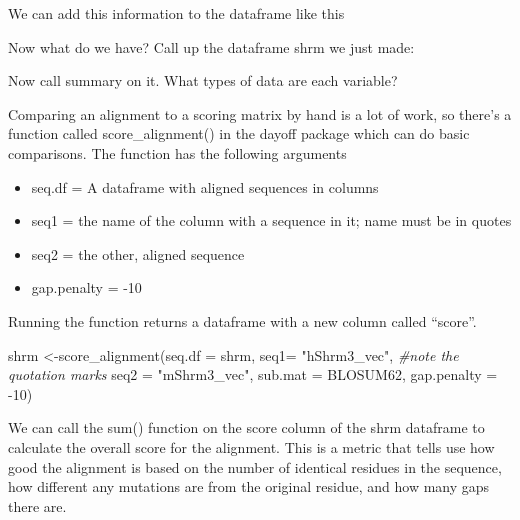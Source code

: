 \documentclass[
]{book}
\newenvironment{Shaded}{\begin{snugshade}}{\end{snugshade}}
\newcommand{\AttributeTok}[1]{\textcolor[rgb]{0.77,0.63,0.00}{#1}}
\newcommand{\CommentTok}[1]{\textcolor[rgb]{0.56,0.35,0.01}{\textit{#1}}}
\newcommand{\DecValTok}[1]{\textcolor[rgb]{0.00,0.00,0.81}{#1}}
\newcommand{\FunctionTok}[1]{\textcolor[rgb]{0.00,0.00,0.00}{#1}}
\newcommand{\NormalTok}[1]{#1}
\newcommand{\OtherTok}[1]{\textcolor[rgb]{0.56,0.35,0.01}{#1}}
\newcommand{\SpecialCharTok}[1]{\textcolor[rgb]{0.00,0.00,0.00}{#1}}
\newcommand{\StringTok}[1]{\textcolor[rgb]{0.31,0.60,0.02}{#1}}
\providecommand{\tightlist}{%
  \setlength{\itemsep}{0pt}\setlength{\parskip}{0pt}}
\begin{document}
We can add this information to the dataframe like this

\begin{Shaded}
\end{Shaded}

Now what do we have? Call up the dataframe shrm we just made:

Now call summary on it. What types of data are each variable?

Comparing an alignment to a scoring matrix by hand is a lot of work, so there's a function called score\_alignment() in the dayoff package which can do basic comparisons. The function has the following arguments

\begin{itemize}
\tightlist
\item
  seq.df = A dataframe with aligned sequences in columns
\item
  seq1 = the name of the column with a sequence in it; name must be in quotes
\item
  seq2 = the other, aligned sequence
\item
  gap.penalty = -10
\end{itemize}

Running the function returns a dataframe with a new column called ``score''.

\begin{Shaded}
\begin{Highlighting}[]
\NormalTok{shrm }\OtherTok{\textless{}{-}}\FunctionTok{score\_alignment}\NormalTok{(}\AttributeTok{seq.df =}\NormalTok{ shrm, }
                \AttributeTok{seq1=}  \StringTok{"hShrm3\_vec"}\NormalTok{,  }\CommentTok{\#note the quotation marks}
                \AttributeTok{seq2 =} \StringTok{"mShrm3\_vec"}\NormalTok{,}
                \AttributeTok{sub.mat =}\NormalTok{ BLOSUM62,}
                \AttributeTok{gap.penalty =}  \SpecialCharTok{{-}}\DecValTok{10}\NormalTok{)}
\end{Highlighting}
\end{Shaded}

We can call the sum() function on the score column of the shrm dataframe to calculate the overall score for the alignment. This is a metric that tells use how good the alignment is based on the number of identical residues in the sequence, how different any mutations are from the original residue, and how many gaps there are.
\end{document}
